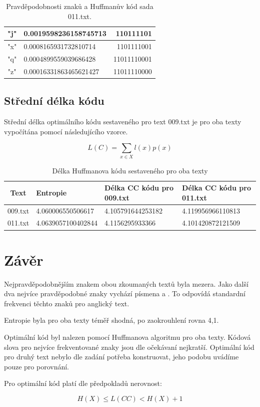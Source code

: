 \documentclass[12pt]{article}
\begin{document}
\begin{table}[!ht]
\begin{tabular}{ | c | l | r | }
"j"     &       0.0019598236158745713   &       110111101       \\ \hline
"x"     &       0.0008165931732810714   &       1101111001      \\ \hline
"q"     &       0.0004899559039686428   &       11011110001     \\ \hline
"z"     &       0.00016331863465621427  &       11011110000     \\ \hline
\end{tabular}
\caption{Pravděpodobnosti znaků a Huffmanův kód sada 011.txt.}
\label{pzhk_011.txt_table}
\end{table}   		
 
			
   		\subsection{Střední délka kódu}\label{sdk}
			Střední délka optimálního kódu sestaveného pro text 009.txt je pro oba texty vypočítána pomocí následujícího vzorce.
			
			$$ L(C) = \sum_{x \displaystyle \in X} l(x) p(x)$$		
   		
\begin{table}[!ht]
\centering
\begin{tabular}{ | c | l | l | l | } \hline
Text	& Entropie & Délka CC kódu pro 009.txt & Délka CC kódu pro 011.txt \\ \hline
009.txt & 4.060006550506617 & 4.105791644253182 & 4.119956966110813 \\ \hline
011.txt & 4.0639057100402844 & 4.1156295933366   & 4.101420872121509 \\ \hline
\end{tabular}
\caption{Délka Huffmanova kódu sestaveného pro oba texty}
\label{code_table}
\end{table}


   	\section{Závěr}\label{z}
   		Nejpravděpodobnějším znakem obou zkoumaných textů byla mezera. Jako další dva nejvíce pravděpodobné znaky vychází písmena  a . To odpovídá standardní frekvenci těchto znaků pro anglický text.
   		
   		Entropie byla pro oba texty téměř shodná, po zaokrouhlení rovna 4,1.
   		
   		Optimální kód byl nalezen pomocí Huffmanova algoritmu pro oba texty. Kódová slova pro nejvíce frekventované znaky jsou dle očekávaní nejkratší. Optimální kód pro druhý text nebylo dle zadání potřeba konstruovat, jeho podobu uvádíme pouze pro porovnání.
   		
   		Pro optimální kód platí dle předpokladů nerovnost:
   		
   		$$ H(X) \leq L(CC) < H(X) + 1 $$
   		
   		
   		
\end{document}
